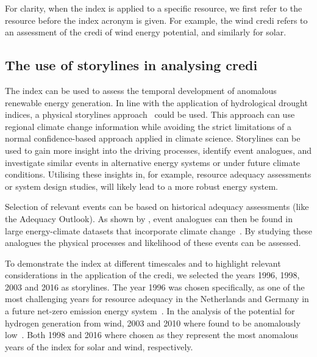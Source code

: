 \documentclass[a4paper,11pt]{extarticle}
\newcommand{\credi}[0]{{\sc credi}}
\newcommand{\wdi}[0]{{\sc wind credi}}
\begin{document}
For clarity, when the index is applied to a specific resource, we first refer to the resource before the index acronym is given. 
For example, the \wdi{} refers to an assessment of the \credi{} of wind energy potential, and similarly for solar.




\subsection{The use of storylines in analysing \credi }\label{secCP2:storylines}
The index can be used to assess the temporal development of anomalous renewable energy generation. 
In line with the application of hydrological drought indices, a physical storylines approach~\parencite{Shepherd2019,vanderWiel2021} could be used. 
This approach can use regional climate change information while avoiding the strict limitations of a normal confidence-based approach applied in climate science. 
Storylines can be used to gain more insight into the driving processes, identify event analogues, and investigate similar events in alternative energy systems or under future climate conditions. 
Utilising these insights in, for example, resource adequacy assessments or system design studies, will likely lead to a more robust energy system.

Selection of relevant events can be based on historical adequacy assessments (like the \parencite{tennet2023} Adequacy Outlook). 
As shown by \textcite{vanderwiel2019extreme,vanderWiel2021}, event analogues can then be found in large energy-climate datasets that incorporate climate change~\parencite{craig2022disconnect,Dubus2022PECD}. 
By studying these analogues the physical processes and likelihood of these events can be assessed.

To demonstrate the index at different timescales and to highlight relevant considerations in the application of the \credi, we selected the years 1996, 1998, 2003 and 2016 as storylines. 
The year 1996 was chosen specifically, as one of the most challenging years for resource adequacy in the Netherlands and Germany in a future net-zero emission energy system~\parencite[][p.56]{tennet2023}. 
In the analysis of the potential for hydrogen generation from wind, 2003 and 2010 where found to be anomalously low~\parencite[][p.58-61]{tennet2023}. 
Both 1998 and 2016 where chosen as they represent the most anomalous years of the index for solar and wind, respectively.
\end{document}
